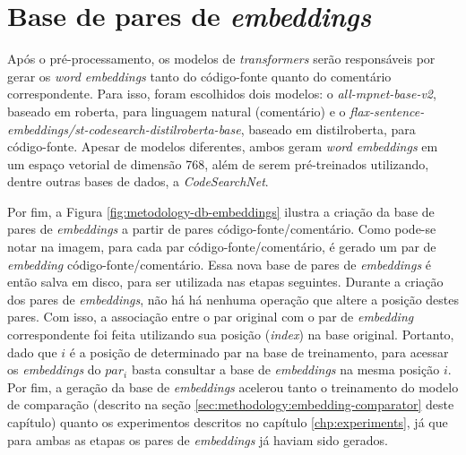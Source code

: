 \section{Base de pares de \textit{embeddings}}
\label{sec:methodology:encoders}
Após o pré-processamento, os modelos de \textit{transformers} serão responsáveis por gerar os \textit{word embeddings} tanto do código-fonte quanto do comentário correspondente. Para isso, foram escolhidos dois modelos: o \textit{all-mpnet-base-v2}, baseado em \gls{roberta}, para linguagem natural (comentário) e o \textit{flax-sentence-embeddings/st-codesearch-distilroberta-base}, baseado em \gls{distilroberta}, para código-fonte. Apesar de modelos diferentes, ambos geram \textit{word embeddings} em um espaço vetorial de dimensão 768, além de serem pré-treinados utilizando, dentre outras bases de dados, a \textit{CodeSearchNet}.

Por fim, a Figura \ref{fig:metodology-db-embeddings} ilustra a criação da base de pares de \textit{embeddings} a partir de pares código-fonte/comentário. Como pode-se notar na imagem, para cada par código-fonte/comentário, é gerado um par de \textit{embedding} código-fonte/comentário. Essa nova base de pares de \textit{embeddings} é então salva em disco, para ser utilizada nas etapas seguintes. Durante a criação dos pares de \textit{embeddings}, não há há nenhuma operação que altere a posição destes pares. Com isso, a associação entre o par original com o par de \textit{embedding} correspondente foi feita utilizando sua posição (\textit{index}) na base original. Portanto, dado que $i$ é a posição de determinado par na base de treinamento, para acessar os \textit{embeddings} do $par_i$ basta consultar a base de \textit{embeddings} na mesma posição $i$. Por fim, a geração da base de \textit{embeddings} acelerou tanto o treinamento do modelo de comparação (descrito na seção \ref{sec:methodology:embedding-comparator} deste capítulo) quanto os experimentos descritos no capítulo \ref{chp:experiments}, já que para ambas as etapas os pares de \textit{embeddings} já haviam sido gerados.

